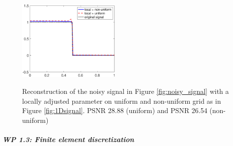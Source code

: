 \documentclass[enabledeprecatedfontcommands,cleardoublepage=empty,headsepline,twoside,11pt,DIV=15,BCOR=12mm,final]{scrartcl}
\begin{document}
\begin{figure}[h!]
\begin{center}
{\includegraphics[width=5cm]{Comparison_uniform_nonuniform_mesh_average}}
\caption{Reconstruction of the noisy signal in Figure \ref{fig:noisy_signal} with a locally adjusted parameter on uniform and non-uniform grid as in Figure \ref{fig:1Dsignal}. PSNR 28.88 (uniform) and PSNR 26.54 (non-uniform)}\label{fig:PSNR}
\end{center}
\end{figure}
 
 
 \subparagraph{WP 1.3: Finite element discretization}
 
\end{document}
